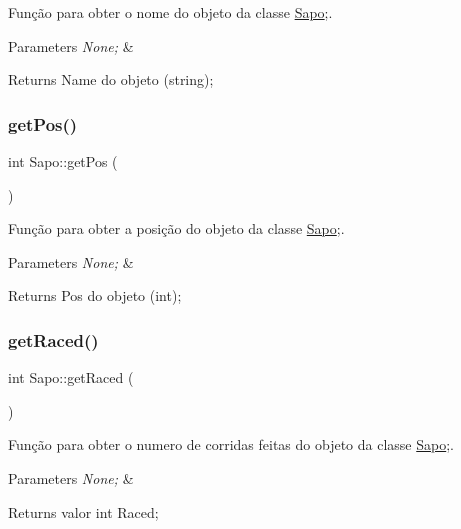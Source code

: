 Função para obter o nome do objeto da classe \mbox{\hyperlink{class_sapo}{Sapo}};. 


\begin{DoxyParams}{Parameters}
{\em None;} & \\
\hline
\end{DoxyParams}
\begin{DoxyReturn}{Returns}
Name do objeto (string); 
\end{DoxyReturn}
\mbox{\label{class_sapo_aa46b67f81896866d31fd0105b2c01dca}} 
\subsubsection{\texorpdfstring{get\+Pos()}{getPos()}}
{\footnotesize\ttfamily int Sapo\+::get\+Pos (\begin{DoxyParamCaption}{ }\end{DoxyParamCaption})}



Função para obter a posição do objeto da classe \mbox{\hyperlink{class_sapo}{Sapo}};. 


\begin{DoxyParams}{Parameters}
{\em None;} & \\
\hline
\end{DoxyParams}
\begin{DoxyReturn}{Returns}
Pos do objeto (int); 
\end{DoxyReturn}
\mbox{\label{class_sapo_a1a37dd6a785b8ac2fef0f29832856d77}} 
\subsubsection{\texorpdfstring{get\+Raced()}{getRaced()}}
{\footnotesize\ttfamily int Sapo\+::get\+Raced (\begin{DoxyParamCaption}{ }\end{DoxyParamCaption})}



Função para obter o numero de corridas feitas do objeto da classe \mbox{\hyperlink{class_sapo}{Sapo}};. 


\begin{DoxyParams}{Parameters}
{\em None;} & \\
\hline
\end{DoxyParams}
\begin{DoxyReturn}{Returns}
valor int Raced; 
\end{DoxyReturn}
\mbox{\label{class_sapo_a5cf904ad7ff69d664fa44f7b7305c434}} 
